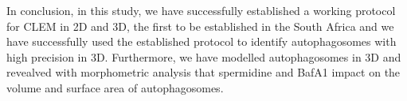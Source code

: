 In conclusion, in this study, we have successfully established a working protocol for CLEM in 2D and 3D, the first to be established in the South Africa and we have successfully used the established protocol to identify autophagosomes with high precision in 3D. Furthermore, we have modelled autophagosomes in 3D  and revealved with morphometric analysis that spermidine and BafA1 impact on the volume and surface area of autophagosomes. 

